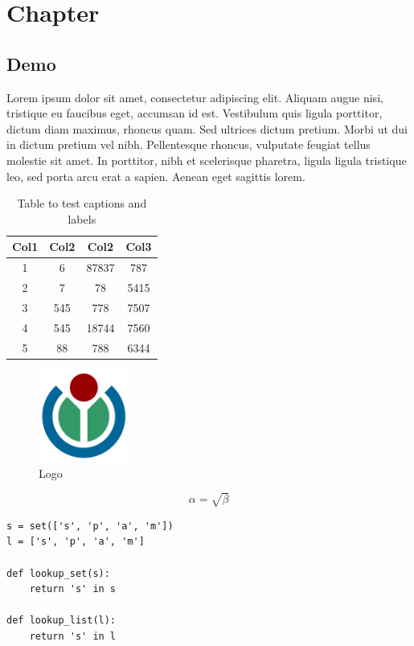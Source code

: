 \chapter{Chapter}
\label{chap:Chapter}

\section{Demo}
\label{sec:Demo}

Lorem ipsum dolor sit amet, consectetur adipiscing elit. Aliquam augue nisi,
tristique eu faucibus eget, accumsan id est. Vestibulum quis ligula porttitor,
dictum diam maximus, rhoncus quam. Sed ultrices dictum pretium. Morbi ut dui in
dictum \cite{latexcompanion} pretium vel nibh. Pellentesque rhoncus, vulputate
feugiat tellus molestie sit amet. In porttitor, nibh et scelerisque pharetra,
ligula ligula tristique leo, sed porta arcu erat a sapien. Aenean eget sagittis
lorem.

\begin{table}[h!]
    \centering
    \begin{tabular}{|c c c c|}
        \hline
        Col1 & Col2 & Col2 & Col3 \\
        \hline
        1 & 6 & 87837 & 787 \\
        2 & 7 & 78 & 5415 \\
        3 & 545 & 778 & 7507 \\
        4 & 545 & 18744 & 7560 \\
        5 & 88 & 788 & 6344 \\
        \hline
    \end{tabular}
    \caption{Table to test captions and labels}
    \label{table}
\end{table}

\begin{figure}[H]
    \centering
    \includegraphics[width=3cm]{images/logo.png}
    \caption{Logo}
    \label{logo}
\end{figure}

\begin{equation}
    \label{simple_equation}
    \alpha = \sqrt{ \beta }
\end{equation}

\begin{verbatim}
s = set(['s', 'p', 'a', 'm'])
l = ['s', 'p', 'a', 'm']

def lookup_set(s):
    return 's' in s

def lookup_list(l):
    return 's' in l
\end{verbatim}
